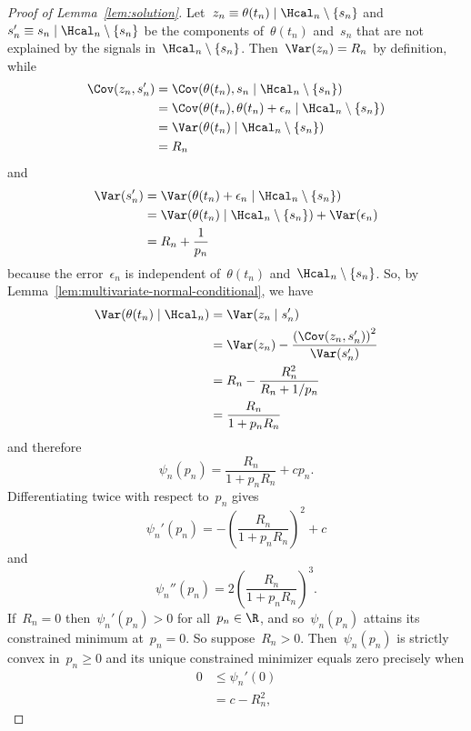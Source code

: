 \begin{proof}[Proof of Lemma~\ref{lem:solution}]
    Let~$z_n\equiv\theta(t_n)\mid\Hcal_n\setminus\{s_n\}$ and~$s_n'\equiv s_n\mid\Hcal_n\setminus\{s_n\}$ be the components of~$\theta(t_n)$ and~$s_n$ that are not explained by the signals in~$\Hcal_n\setminus\{s_n\}$.
    Then~$\Var(z_n)=R_n$ by definition, while
    \begin{align*}
        \Cov(z_n,s_n')
        &= \Cov(\theta(t_n),s_n\mid\Hcal_n\setminus\{s_n\}) \\
        &= \Cov(\theta(t_n),\theta(t_n)+\epsilon_n\mid\Hcal_n\setminus\{s_n\}) \\
        &= \Var(\theta(t_n)\mid\Hcal_n\setminus\{s_n\}) \\
        &= R_n
    \end{align*}
    and
    \begin{align*}
        \Var(s_n')
        &= \Var(\theta(t_n)+\epsilon_n\mid\Hcal_n\setminus\{s_n\}) \\
        &= \Var(\theta(t_n)\mid\Hcal_n\setminus\{s_n\})+\Var(\epsilon_n) \\
        &= R_n+\frac{1}{p_n}
    \end{align*}
    because the error~$\epsilon_n$ is independent of~$\theta(t_n)$ and~$\Hcal_n\setminus\{s_n\}$.
    So, by Lemma~\ref{lem:multivariate-normal-conditional}, we have
    \begin{align*}
        \Var(\theta(t_n)\mid\Hcal_n)
        &= \Var(z_n\mid s_n') \\
        &= \Var(z_n)-\frac{\left(\Cov(z_n,s_n')\right)^2}{\Var(s_n')} \\
        &= R_n-\frac{R_n^2}{R_n+1/p_n} \\
        &= \frac{R_n}{1+p_nR_n}
    \end{align*}
    and therefore
    \[ \psi_n(p_n)=\frac{R_n}{1+p_nR_n}+cp_n. \]
    Differentiating twice with respect to~$p_n$ gives
    \[ \psi_n'(p_n)=-\left(\frac{R_n}{1+p_nR_n}\right)^2+c \]
    and
    \[ \psi_n''(p_n)=2\left(\frac{R_n}{1+p_nR_n}\right)^3. \]
    If~$R_n=0$ then~$\psi_n'(p_n)>0$ for all~$p_n\in\R$, and so~$\psi_n(p_n)$ attains its constrained minimum at~$p_n=0$.
    So suppose~$R_n>0$.
    Then~$\psi_n(p_n)$ is strictly convex in~$p_n\ge0$ and its unique constrained minimizer equals zero precisely when
    \begin{align*}
        0
        &\le \psi_n'(0) \\
        &= c-R_n^2,
    \end{align*}

\end{proof}
